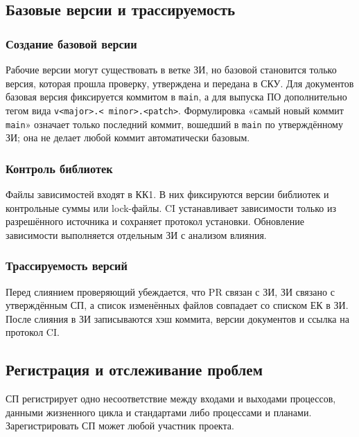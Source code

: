 \documentclass{tpks}
\begin{document}
\subsection{Базовые версии и трассируемость}

\subsubsection{Создание базовой версии}

Рабочие версии могут существовать в ветке ЗИ, но базовой становится только версия,
которая прошла проверку, утверждена и передана в СКУ. Для документов базовая
версия фиксируется коммитом в \texttt{main}, а для выпуска ПО дополнительно тегом
вида \texttt{v\allowbreak\textless major\textgreater.\allowbreak\textless
minor\textgreater.\allowbreak\textless patch\textgreater}. Формулировка «самый
новый коммит \texttt{main}» означает только последний коммит, вошедший в
\texttt{main} по
утверждённому ЗИ; она не делает любой коммит автоматически базовым.

\subsubsection{Контроль библиотек}

Файлы зависимостей входят в КК1. В них фиксируются версии библиотек и контрольные
суммы или lock-файлы. CI устанавливает зависимости только из разрешённого
источника и сохраняет протокол установки. Обновление зависимости выполняется
отдельным ЗИ с анализом влияния.

\subsubsection{Трассируемость версий}

Перед слиянием проверяющий убеждается, что PR связан с ЗИ, ЗИ связано с
утверждённым СП, а список изменённых файлов совпадает со списком ЕК в ЗИ. После
слияния в ЗИ записываются хэш коммита, версии документов и ссылка на протокол CI.

\subsection{Регистрация и отслеживание проблем}

СП регистрирует одно несоответствие между входами и выходами процессов, данными
жизненного цикла и стандартами либо процессами и планами. Зарегистрировать СП
может любой участник проекта.
\end{document}

